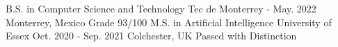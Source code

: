 \begin{cventries}
  \cventry
    {B.S. in Computer Science and Technology}
    {Tec de Monterrey}
    { - May. 2022} %
    {Monterrey, Mexico} %
    {Grade 93/100}
  \cventry
    {M.S. in Artificial Intelligence}
    {University of Essex}
    {Oct. 2020 - Sep. 2021} %
    {Colchester, UK} %
    {Passed with Distinction}
\end{cventries}
